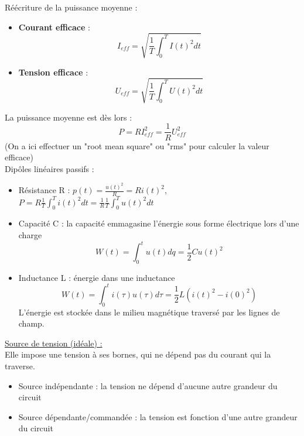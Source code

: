 \documentclass[../main.tex]{subfiles}
\begin{document}
Réécriture de la puissance moyenne : \begin{itemize}
    \item \textbf{Courant efficace} : \begin{equation}
        I_{eff} = \sqrt{\frac{1}{T} \int_0^T I(t)^2dt}
    \end{equation}
    \item \textbf{Tension efficace} : \begin{equation}
        U_{eff} = \sqrt{\frac{1}{T} \int_0^T U(t)^2dt}
    \end{equation}
\end{itemize}
La puissance moyenne est dès lors : \begin{equation}
    P = RI_{eff}^2 = \frac{1}{R} U_{eff}^2
\end{equation}
(On a ici effectuer un "root mean square" ou "rms" pour calculer la valeur efficace)\\

Dipôles linéaires passifs : \begin{itemize}
    \item Résistance R : $p(t) = \frac{u(t)^2}{R} = R i(t)^2$, $P = R \frac{1}{T} \int_0^T i(t)^2dt = \frac{1}{R} \frac{1}{T} \int_0^T u(t)^2dt$\\
    \item Capacité C : la capacité emmagasine l'énergie sous forme électrique lors d'une charge \begin{equation}
        W(t) = \int_0^t u(t)dq = \frac{1}{2}Cu(t)^2
    \end{equation}
    \item Inductance L : énergie dans une inductance \begin{equation}
        W(t) = \int_0^t i(\tau) u(\tau)d\tau = \frac{1}{2} L(i(t)^2-i(0)^2)
    \end{equation}
    L'énergie est stockée dans le milieu magnétique traversé par les lignes de champ. 
\end{itemize}

\underline{Source de tension (idéale) :}\\
Elle impose une tension à ses bornes, qui ne dépend pas du courant qui la traverse. \begin{itemize}
    \item Source indépendante : la tension ne dépend d'aucune autre grandeur du circuit\\
    \item Source dépendante/commandée : la tension est fonction d'une autre grandeur du circuit\\
\end{itemize}
\end{document}

